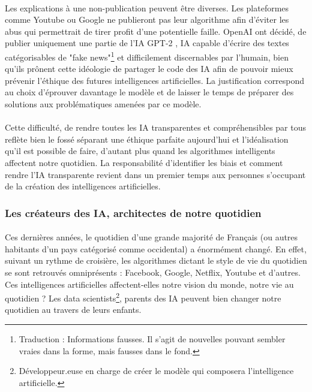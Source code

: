 \documentclass[10pt, french, a4paper]{report}
\begin{document}
\paragraph{}
Les explications à une non-publication peuvent être diverses. Les plateformes comme Youtube ou Google ne publieront pas leur algorithme afin d'éviter les abus qui permettrait de tirer profit d’une potentielle faille. OpenAI ont décidé, de publier uniquement une partie de l’IA GPT-2 \citep{radford_language_2019}, IA capable d’écrire des textes catégorisables de "fake news"\footnote{Traduction : Informations fausses. Il s’agit de nouvelles pouvant sembler vraies dans la forme, mais fausses dans le fond.} et difficilement discernables par l’humain, bien qu’ils prônent cette idéologie de partager le code des IA afin de pouvoir mieux prévenir l’éthique des futures intelligences artificielles. La justification correspond au choix d’éprouver davantage le modèle et de laisser le temps de préparer des solutions aux problématiques amenées par ce modèle.

\paragraph{}
Cette difficulté, de rendre toutes les IA transparentes et compréhensibles par tous reflète bien le fossé séparant une éthique parfaite aujourd’hui et l’idéalisation qu’il est possible de faire, d’autant plus quand les algorithmes intelligents affectent notre quotidien. La responsabilité d’identifier les biais et comment rendre l’IA transparente revient dans un premier temps aux personnes s’occupant de la création des intelligences artificielles.

\subsubsection{Les créateurs des IA, architectes de notre quotidien}

\paragraph{}
Ces dernières années, le quotidien d’une grande majorité de Français (ou autres habitants d’un pays catégorisé comme occidental) a énormément changé. En effet, suivant un rythme de croisière, les algorithmes dictant le style de vie du quotidien se sont retrouvés omniprésents : Facebook, Google, Netflix, Youtube et d’autres. Ces intelligences artificielles affectent-elles notre vision du monde, notre vie au quotidien ? Les data scientists\footnote{Développeur.euse en charge de créer le modèle qui composera l’intelligence artificielle.}, parents des IA peuvent bien changer notre quotidien au travers de leurs enfants.
\end{document}
